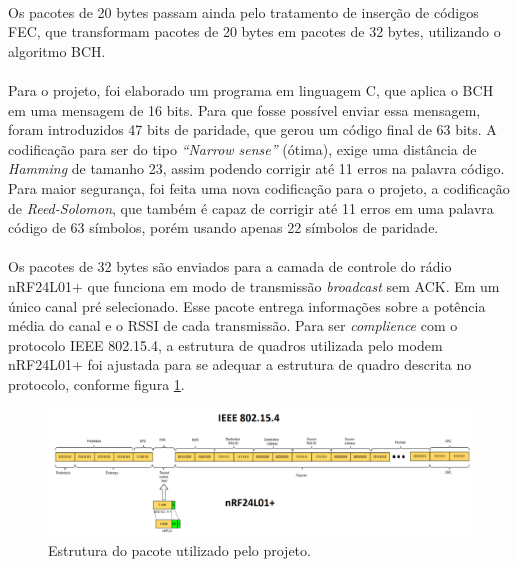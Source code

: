 \paragraph{} Os pacotes de 20 bytes passam ainda pelo tratamento de inserção de códigos FEC, que transformam pacotes de 20 bytes em pacotes de 32 bytes, utilizando o algoritmo BCH.

\paragraph{} Para o projeto, foi elaborado um programa em linguagem C, que aplica o BCH em uma mensagem de 16 bits. Para que fosse possível enviar essa mensagem, foram introduzidos 47 bits de paridade, que gerou um código final de 63 bits. A codificação para ser do tipo \textit{“Narrow sense”} (ótima), exige uma distância de \textit{Hamming} de tamanho 23, assim podendo corrigir até 11 erros na palavra código. Para maior segurança, foi feita uma nova codificação para o projeto, a codificação de \textit{Reed-Solomon}, que também é capaz de corrigir até 11 erros em uma palavra código de 63 símbolos, porém usando apenas 22 símbolos de paridade. 

\paragraph{} Os pacotes de 32 bytes são enviados para a camada de controle do rádio nRF24L01+ que funciona em modo de transmissão \textit{broadcast} sem ACK. Em um único canal pré selecionado. Esse pacote entrega informações sobre a potência média do canal e o RSSI de cada transmissão. Para ser \textit{complience} com o protocolo IEEE 802.15.4, a estrutura de quadros utilizada pelo modem nRF24L01+ foi ajustada para se adequar a estrutura de quadro descrita no protocolo, conforme figura \ref{fig:figura80}.

\begin{figure}[!ht]
	\centering
	\includegraphics[width=1\textwidth]{Figuras/pacote_final.PNG}   
	\caption{Estrutura do pacote utilizado pelo projeto.}
	\label{fig:figura80}
\end{figure}

